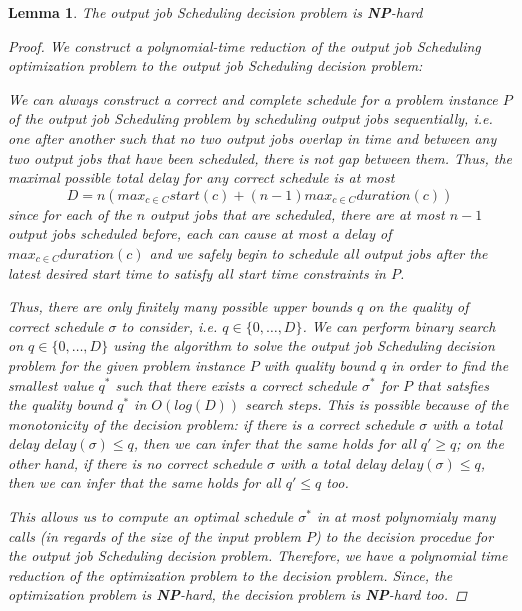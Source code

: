 \documentclass{article}
\newtheorem{mylemma}{Lemma}
\begin{document}
\begin{mylemma}
\label{thm:ic-scheduling-decision-problem-is-NP-hard}
The {\sc output job Scheduling} decision problem is {\bf NP}-hard
\begin{proof}
We construct a polynomial-time reduction of the {\sc output job Scheduling} optimization problem to the {\sc output job Scheduling} decision problem: 

We can always construct a correct and complete schedule for a problem instance $P$ of the {\sc output job Scheduling} problem by scheduling output jobs sequentially, i.e. one after another such that no two output jobs overlap in time and  between any two output jobs that have been scheduled, there is not gap between them. Thus, the maximal possible total delay for any correct schedule is at most
\[ D =n ({max}_{c \in C}{start}(c)  + (n-1) {max}_{c \in C}{duration}(c)) \]
since for each of the $n$ output jobs that are scheduled, there are at most $n-1$ output jobs scheduled before,  each can cause at most a delay of ${max}_{c \in C}{duration}(c)$ and we safely begin to schedule all output jobs after the latest desired start time to satisfy all start time constraints in $P$. 

Thus, there are only finitely many possible upper bounds $q$ on the quality of correct schedule $\sigma$  to consider, i.e. $q \in \{0,\ldots, D\}$. We can perform binary search on  $q \in \{0,\ldots, D\}$ using the algorithm to solve the {\sc output job Scheduling} decision problem for the given problem instance $P$ with quality bound $q$ in order to find the smallest value $q^*$ such that there exists a correct schedule $\sigma^*$ for $P$ that satsfies the quality bound $q^*$  in $O(log(D))$ search steps. This is possible because of the monotonicity of the decision problem: if there is a correct schedule $\sigma$  with a total delay ${delay}(\sigma) \leq q$, then we can infer that the same holds for all $q' \geq q$; on the other hand, if there is no correct schedule $\sigma$  with a total delay ${delay}(\sigma) \leq q$, then we can infer that the same holds for all $q' \leq q$ too.

 This allows us to compute an optimal schedule $\sigma^*$ in at most polynomialy many calls (in regards of the size of the input problem $P$) to the decision procedue for the {\sc output job Scheduling} decision problem. Therefore, we have a polynomial time reduction of the optimization problem to the decision problem. Since, the optimization problem is {\bf  NP}-hard, the decision problem is {\bf NP}-hard too.
\end{proof}


\end{mylemma}
\end{document}
